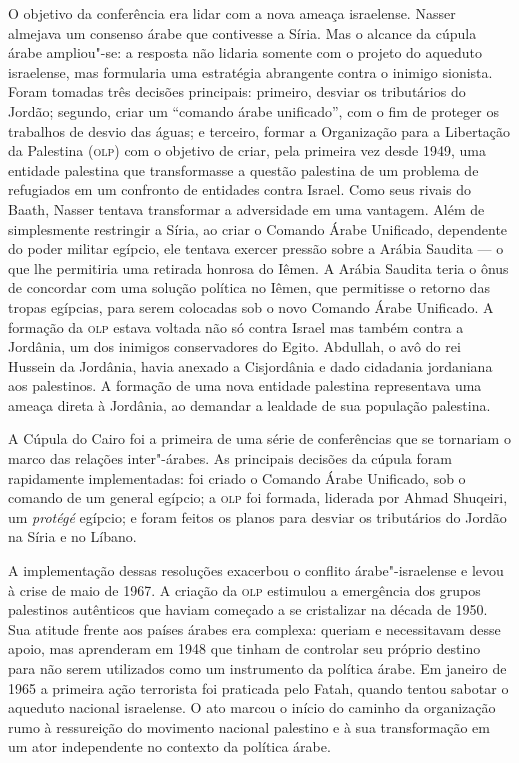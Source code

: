 O objetivo da conferência era lidar com a nova ameaça israelense. Nasser
almejava um consenso árabe que contivesse a Síria. Mas o alcance da
cúpula árabe ampliou"-se: a resposta não lidaria somente com o
projeto do aqueduto israelense, mas formularia uma estratégia abrangente
contra o inimigo sionista. Foram tomadas três decisões principais:
primeiro, desviar os tributários do Jordão; segundo, criar um ``comando
árabe unificado'', com o fim de proteger os trabalhos de desvio das
águas; e terceiro, formar a Organização para a Libertação da Palestina
(\textsc{olp}) com o objetivo de criar, pela primeira vez desde 1949, uma
entidade palestina que transformasse a questão palestina de um problema
de refugiados em um confronto de entidades contra Israel. Como seus
rivais do Baath, Nasser tentava transformar a adversidade em uma
vantagem. Além de simplesmente restringir a Síria, ao criar o Comando
Árabe Unificado, dependente do poder militar egípcio, ele tentava
exercer pressão sobre a Arábia Saudita --- o que lhe permitiria uma
retirada honrosa do Iêmen. A Arábia Saudita teria o ônus de concordar
com uma solução política no Iêmen, que permitisse o retorno das tropas
egípcias, para serem colocadas sob o novo Comando Árabe Unificado. A
formação da \textsc{olp} estava voltada não só contra Israel mas também contra a
Jordânia, um dos inimigos conservadores do Egito. Abdullah, o avô do rei
Hussein da Jordânia, havia anexado a Cisjordânia e dado cidadania
jordaniana aos palestinos. A formação de uma nova entidade palestina
representava uma ameaça direta à Jordânia, ao demandar a lealdade de sua
população palestina.

A Cúpula do Cairo foi a primeira de uma série de conferências que se
tornariam o marco das relações inter"-árabes. As principais decisões da
cúpula foram rapidamente implementadas: foi criado o Comando Árabe
Unificado, sob o comando de um general egípcio; a \textsc{olp} foi formada,
liderada por Ahmad Shuqeiri, um \emph{protégé} egípcio; e foram feitos
os planos para desviar os tributários do Jordão na Síria e no Líbano.

A implementação dessas resoluções exacerbou o conflito árabe"-israelense
e levou à crise de maio de 1967. A criação da \textsc{olp} estimulou a emergência
dos grupos palestinos autênticos que haviam começado a se cristalizar na
década de 1950. Sua atitude frente aos países árabes era complexa:
queriam e necessitavam desse apoio, mas aprenderam em 1948 que tinham de
controlar seu próprio destino para não serem utilizados como um
instrumento da política árabe. Em janeiro de 1965 a primeira ação
terrorista foi praticada pelo Fatah, quando tentou sabotar o aqueduto
nacional israelense. O ato marcou o início do caminho da organização
rumo à ressureição do movimento nacional palestino e à sua transformação
em um ator independente no contexto da política árabe.

